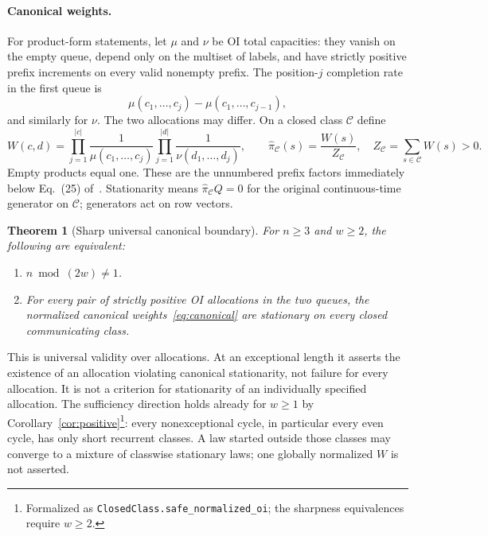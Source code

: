 \documentclass[11pt]{article}
\newtheorem{theorem}{Theorem}
\theoremstyle{remark}
\begin{document}
\paragraph{Canonical weights.}
For product-form statements, let $\mu$ and $\nu$ be OI total capacities: they vanish on the empty queue, depend only on the multiset of labels, and have strictly positive prefix increments on every valid nonempty prefix. The position-$j$ completion rate in the first queue is
\[
 \mu(c_1,\ldots,c_j)-\mu(c_1,\ldots,c_{j-1}),
\]
and similarly for $\nu$. The two allocations may differ. On a closed class $\mathcal C$ define
\begin{equation}\label{eq:canonical}
 W(c,d)=\prod_{j=1}^{|c|}\frac1{\mu(c_1,\ldots,c_j)}
         \prod_{j=1}^{|d|}\frac1{\nu(d_1,\ldots,d_j)},\qquad
 \widehat\pi_{\mathcal C}(s)=\frac{W(s)}{Z_{\mathcal C}},\quad
 Z_{\mathcal C}=\sum_{s\in\mathcal C}W(s)>0.
\end{equation}
Empty products equal one. These are the unnumbered prefix factors immediately below Eq.~(25) of~\cite[p.~240]{DG}. Stationarity means $\widehat\pi_{\mathcal C}Q=0$ for the original continuous-time generator on $\mathcal C$; generators act on row vectors.

\begin{theorem}[Sharp universal canonical boundary]\label{thm:sharp}
For $n\ge3$ and $w\ge2$, the following are equivalent:
\begin{enumerate}
\item $n\bmod(2w)\ne1$.
\item For every pair of strictly positive OI allocations in the two queues, the normalized canonical weights~\eqref{eq:canonical} are stationary on every closed communicating class.
\end{enumerate}
\end{theorem}

This is universal validity over allocations. At an exceptional length it asserts the existence of an allocation violating canonical stationarity, not failure for every allocation. It is not a criterion for stationarity of an individually specified allocation. The sufficiency direction holds already for $w\ge1$ by Corollary~\ref{cor:positive}\footnote{Formalized as \texttt{ClosedClass.safe\_normalized\_oi}; the sharpness equivalences require $w\ge2$.}: every nonexceptional cycle, in particular every even cycle, has only short recurrent classes. A law started outside those classes may converge to a mixture of classwise stationary laws; one globally normalized $W$ is not asserted.
\end{document}
